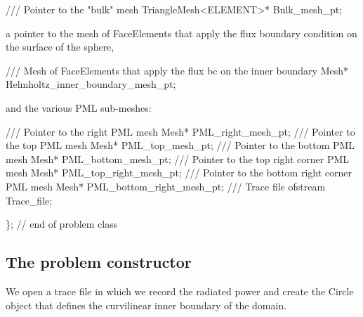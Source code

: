  
\begin{DoxyCodeInclude}
 \textcolor{comment}{/// Pointer to the "bulk" mesh}
 TriangleMesh<ELEMENT>* Bulk\_mesh\_pt;

\end{DoxyCodeInclude}


a pointer to the mesh of Face\+Elements that apply the flux boundary condition on the surface of the sphere,

 
\begin{DoxyCodeInclude}
 \textcolor{comment}{/// Mesh of FaceElements that apply the flux bc on the inner boundary}
 Mesh* Helmholtz\_inner\_boundary\_mesh\_pt;

\end{DoxyCodeInclude}


and the various P\+ML sub-\/meshes\+:

 
\begin{DoxyCodeInclude}
 \textcolor{comment}{/// Pointer to the right PML mesh}
 Mesh* PML\_right\_mesh\_pt;
\textcolor{comment}{}
\textcolor{comment}{ /// Pointer to the top PML mesh}
\textcolor{comment}{} Mesh* PML\_top\_mesh\_pt;
\textcolor{comment}{}
\textcolor{comment}{ /// Pointer to the bottom PML mesh}
\textcolor{comment}{} Mesh* PML\_bottom\_mesh\_pt;
\textcolor{comment}{}
\textcolor{comment}{ /// Pointer to the top right corner PML mesh}
\textcolor{comment}{} Mesh* PML\_top\_right\_mesh\_pt;
\textcolor{comment}{}
\textcolor{comment}{ /// Pointer to the bottom right corner PML mesh}
\textcolor{comment}{} Mesh* PML\_bottom\_right\_mesh\_pt;
\textcolor{comment}{}
\textcolor{comment}{ /// Trace file}
\textcolor{comment}{} ofstream Trace\_file;

\}; \textcolor{comment}{// end of problem class}

\end{DoxyCodeInclude}




\hypertarget{index_prb_con}{}\subsection{The problem constructor}\label{index_prb_con}
We open a trace file in which we record the radiated power and create the {\ttfamily Circle} object that defines the curvilinear inner boundary of the domain.


